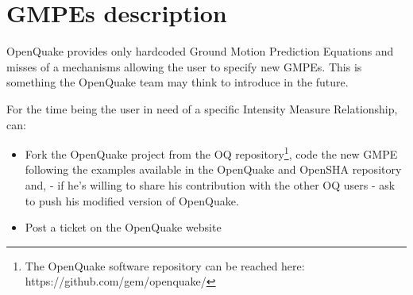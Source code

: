%

%

%

%
\section{GMPEs description}
\label{hazard:gmpe_selection}
OpenQuake provides only hardcoded Ground Motion Prediction Equations and misses of a mechanisms allowing the user to specify new GMPEs. This is something the OpenQuake team may think to introduce in the future. 

For the time being the user in need of a specific Intensity Measure Relationship, can:
\begin{itemize}
\item Fork the OpenQuake project from the OQ repository\footnote{ The OpenQuake software repository can be reached here: \hfill \newline  https://github.com/gem/openquake/}, code the new GMPE following the examples available in the OpenQuake and OpenSHA repository and, - if he's willing to share his contribution with the other OQ users - ask to push his modified version of OpenQuake. 
\item Post a ticket on the OpenQuake website  
\end{itemize}

